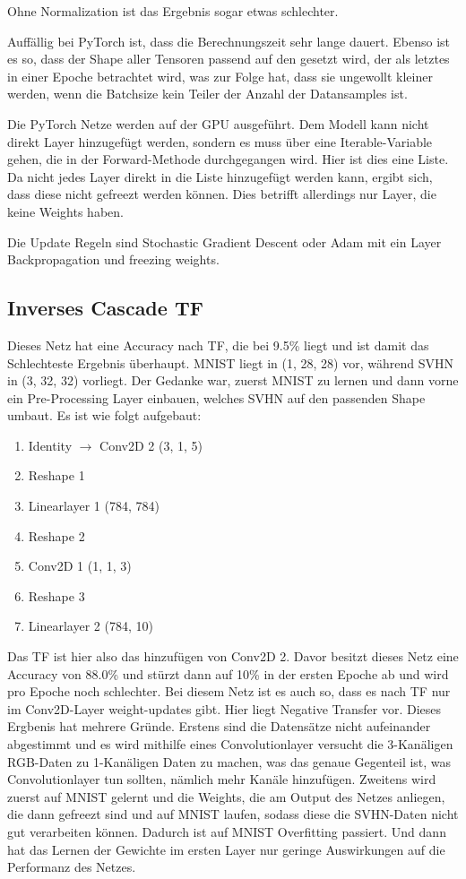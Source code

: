     Ohne Normalization ist das Ergebnis sogar etwas schlechter. 

    Auffällig bei PyTorch ist, dass die Berechnungszeit sehr lange dauert.
    Ebenso ist es so, dass der Shape aller Tensoren passend auf den gesetzt wird, der 
    als letztes in einer Epoche betrachtet wird, was zur Folge hat, dass sie ungewollt 
    kleiner werden, wenn die Batchsize kein Teiler der Anzahl der Datansamples ist. 

    Die PyTorch Netze werden auf der GPU ausgeführt. Dem Modell kann nicht direkt 
    Layer hinzugefügt werden, sondern es muss über eine Iterable-Variable gehen, 
    die in der Forward-Methode durchgegangen wird. Hier ist dies eine Liste. 
    Da nicht jedes Layer direkt in die Liste hinzugefügt werden kann, ergibt sich, 
    dass diese nicht gefreezt werden können. Dies betrifft allerdings nur Layer, die 
    keine Weights haben. 

    Die Update Regeln sind Stochastic Gradient Descent oder Adam mit ein Layer 
    Backpropagation und freezing weights.

\subsection{Inverses Cascade TF}
    Dieses Netz hat eine Accuracy nach TF, die bei 9.5\% liegt und ist damit das 
    Schlechteste Ergebnis überhaupt. MNIST liegt in (1, 28, 28) vor, während 
    SVHN in (3, 32, 32) vorliegt. Der Gedanke war, zuerst MNIST zu lernen und dann 
    vorne ein Pre-Processing Layer einbauen, welches SVHN auf den passenden Shape 
    umbaut. 
    Es ist wie folgt aufgebaut: 
    \begin{enumerate}
        \item Identity $\rightarrow$ Conv2D 2 (3, 1, 5)
        \item Reshape 1
        \item Linearlayer 1 (784, 784)
        \item Reshape 2
        \item Conv2D 1 (1, 1, 3)
        \item Reshape 3
        \item Linearlayer 2 (784, 10)
    \end{enumerate}
    Das TF ist hier also das hinzufügen von Conv2D 2. Davor besitzt dieses Netz eine 
    Accuracy von 88.0\% und stürzt dann auf 10\% in der ersten Epoche ab und wird pro 
    Epoche noch schlechter. Bei diesem Netz ist es auch so, dass es nach TF nur im 
    Conv2D-Layer weight-updates gibt. Hier liegt Negative Transfer vor. 
    Dieses Ergbenis hat mehrere Gründe. Erstens sind die Datensätze nicht
    aufeinander abgestimmt und es wird mithilfe eines Convolutionlayer versucht die 
    3-Kanäligen RGB-Daten zu 1-Kanäligen Daten zu machen, was das genaue Gegenteil ist, 
    was Convolutionlayer tun sollten, nämlich mehr Kanäle hinzufügen. Zweitens wird 
    zuerst auf MNIST gelernt und die Weights, die am Output des Netzes anliegen, die 
    dann gefreezt sind und auf MNIST laufen, sodass diese die SVHN-Daten nicht gut 
    verarbeiten können. Dadurch ist auf MNIST Overfitting passiert. Und dann hat 
    das Lernen der Gewichte im ersten Layer nur geringe Auswirkungen auf die Performanz 
    des Netzes.

